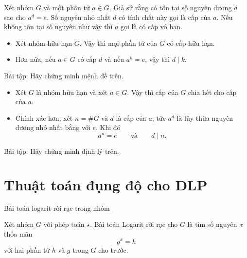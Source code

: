 \begin{frame}
	\begin{dfntn}
		Xét nhóm $G$ và một phần tử $a\in G$. Giả sử rằng có tồn tại số nguyên dương $d$ sao cho $a^d = e$. Số nguyên nhỏ nhất $d$ có tính chất này gọi là cấp của $a$. Nếu không tồn tại số nguyên như vậy thì $a$ gọi là có cấp vô hạn. 
	\end{dfntn}
\end{frame}

\begin{frame}
	\begin{prpstn}
		\begin{itemize}
			\item<+-> 	Xét nhóm hữu hạn $G$. Vậy thì mọi phần tử của $G$ có cấp hữu hạn. 
			\item<+-> Hơn nữa, nếu $a\in G$ có cấp $d$ và nếu $a^k = e$, vậy thì $d\mid k$.

		\end{itemize}
	\end{prpstn}
	Bài tập: Hãy chứng minh mệnh đề trên.
\end{frame}

\begin{frame}
	\begin{thrm}[Lagrange] 
		\begin{itemize}
			\item<+-> Xét $G$ là nhóm hữu hạn và xét $a \in G$. Vậy thì cấp của $G$ chia hết cho cấp của $a$.
		
		
		\item<+-> Chính xác hơn, xét $n = \#G$ và $d$ là cấp của $a$, tức $a^d$ là lũy thừa nguyên dương nhỏ nhất bằng với $e$. Khi đó 
		$$
		a^n= e\qquad \text{và}\qquad d \mid n.
		$$
		\end{itemize}
		
	\end{thrm}
	Bài tập: Hãy chứng minh định lý trên.
\end{frame}

\section{Thuật toán đụng độ cho DLP}
\begin{frame}{Bài toán logarit rời rạc trong nhóm}
  \begin{dfntn}
Xét nhóm $G$ với phép toán $\star$. Bài toán Logarit rời rạc cho $G$ là tìm số nguyên $x$ thỏa mãn
$$
g^x = h
$$
với hai phần tử $h$ và $g$ trong $G$ cho trước.
  \end{dfntn}
\end{frame}

